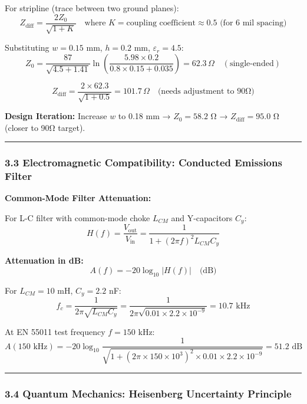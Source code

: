 \documentclass[
]{article}
\begin{document}
For stripline (trace between two ground planes): \[
Z_{\text{diff}} = \frac{2 Z_0}{\sqrt{1 + K}} \quad \text{where } K = \text{coupling coefficient} \approx 0.5 \text{ (for 6 mil spacing)}
\]

Substituting \(w = 0.15\) mm, \(h = 0.2\) mm, \(\varepsilon_r = 4.5\):
\[
Z_0 = \frac{87}{\sqrt{4.5 + 1.41}} \ln\left( \frac{5.98 \times 0.2}{0.8 \times 0.15 + 0.035} \right) = 62.3 \, \Omega \quad (\text{single-ended})
\]

\[
Z_{\text{diff}} = \frac{2 \times 62.3}{\sqrt{1 + 0.5}} = 101.7 \, \Omega \quad \text{(needs adjustment to 90Ω)}
\]

\textbf{Design Iteration:} Increase \(w\) to 0.18 mm → \(Z_0 = 58.2\) Ω
→ \(Z_{\text{diff}} = 95.0\) Ω (closer to 90Ω target).

\begin{center}\rule{0.5\linewidth}{0.5pt}\end{center}

\hypertarget{electromagnetic-compatibility-conducted-emissions-filter}{%
\subsubsection{3.3 Electromagnetic Compatibility: Conducted Emissions
Filter}\label{electromagnetic-compatibility-conducted-emissions-filter}}

\textbf{Common-Mode Filter Attenuation:}

For L-C filter with common-mode choke \(L_{CM}\) and Y-capacitors
\(C_y\): \[
H(f) = \frac{V_{\text{out}}}{V_{\text{in}}} = \frac{1}{1 + (2\pi f)^2 L_{CM} C_y}
\]

\textbf{Attenuation in dB:} \[
A(f) = -20 \log_{10} |H(f)| \quad \text{(dB)}
\]

For \(L_{CM} = 10\) mH, \(C_y = 2.2\) nF: \[
f_c = \frac{1}{2\pi \sqrt{L_{CM} C_y}} = \frac{1}{2\pi \sqrt{0.01 \times 2.2 \times 10^{-9}}} = 10.7 \text{ kHz}
\]

At EN 55011 test frequency \(f = 150\) kHz: \[
A(150 \text{ kHz}) = -20 \log_{10} \frac{1}{\sqrt{1 + (2\pi \times 150 \times 10^3)^2 \times 0.01 \times 2.2 \times 10^{-9}}} = 51.2 \text{ dB}
\]

\begin{center}\rule{0.5\linewidth}{0.5pt}\end{center}

\hypertarget{quantum-mechanics-heisenberg-uncertainty-principle}{%
\subsubsection{3.4 Quantum Mechanics: Heisenberg Uncertainty
Principle}\label{quantum-mechanics-heisenberg-uncertainty-principle}}
\end{document}
